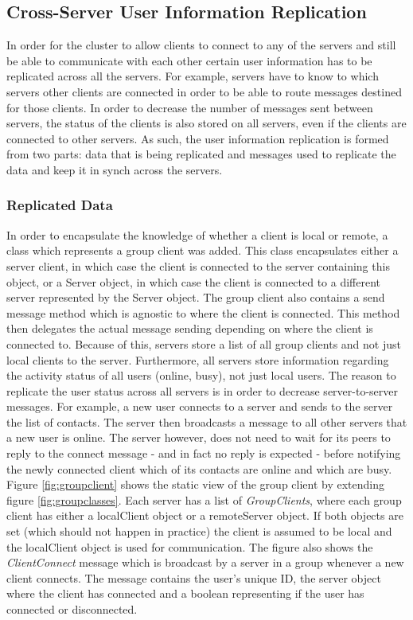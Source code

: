 \subsection{Cross-Server User Information Replication}

In order for the cluster to allow clients to connect to any of the servers and still be able to communicate with each other certain user information has to be replicated across all the servers. For example, servers have to know to which servers other clients are connected in order to be able to route messages destined for those clients. In order to decrease the number of messages sent between servers, the status of the clients is also stored on all servers, even if the clients are connected to other servers. As such, the user information replication is formed from two parts: data that is being replicated and messages used to replicate the data and keep it in synch across the servers.

\subsubsection*{Replicated Data}

In order to encapsulate the knowledge of whether a client is local or remote, a class which represents a group client was added. This class encapsulates either a server client, in which case the client is connected to the server containing this object, or a Server object, in which case the client is connected to a different server represented by the Server object. The group client also contains a send message method which is agnostic to where the client is connected. This method then delegates the actual message sending depending on where the client is connected to. Because of this, servers store a list of all group clients and not just local clients to the server. Furthermore, all servers store information regarding the activity status of all users (online, busy), not just local users. The reason to replicate the user status across all servers is in order to decrease server-to-server messages. For example, a new user connects to a server and sends to the server the list of contacts. The server then broadcasts a message to all other servers that a new user is online. The server however, does not need to wait for its peers to reply to the connect message - and in fact no reply is expected - before notifying the newly connected client which of its contacts are online and which are busy. Figure \ref{fig:groupclient} shows the static view of the group client by extending figure \ref{fig:groupclasses}. Each server has a list of \textit{GroupClients}, where each group client has either a localClient object or a remoteServer object. If both objects are set (which should not happen in practice) the client is assumed to be local and the localClient object is used for communication. The figure also shows the \textit{ClientConnect} message which is broadcast by a server in a group whenever a new client connects. The message contains the user's unique ID, the server object where the client has connected and a boolean representing if the user has connected or disconnected.

